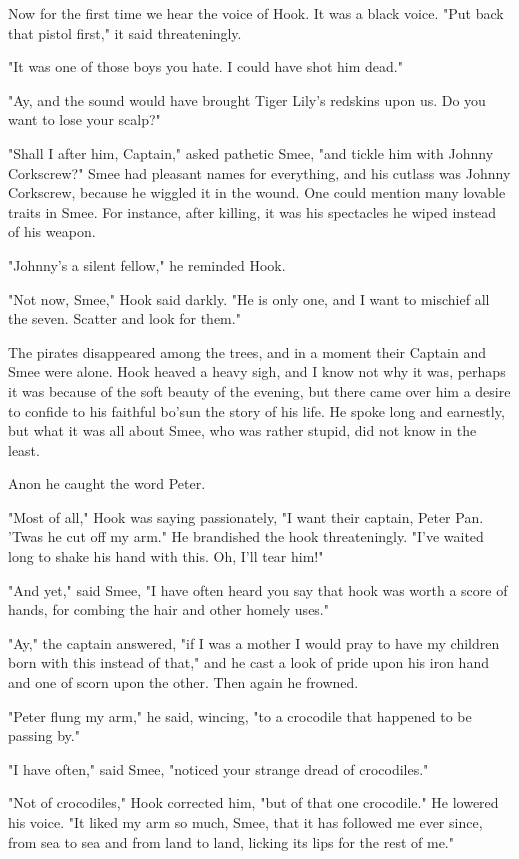 Now for the first time we hear the voice of Hook.
It was a black voice.
"Put back that pistol first," it said threateningly.

"It was one of those boys you hate.
I could have shot him dead."

"Ay, and the sound would have brought Tiger Lily's redskins upon us.
Do you want to lose your scalp?"

"Shall I after him, Captain," asked pathetic Smee, "and tickle him with Johnny Corkscrew?"
Smee had pleasant names for everything,
and his cutlass was Johnny Corkscrew, because he wiggled it in the wound.
One could mention many lovable traits in Smee.
For instance, after killing, it was his spectacles he wiped instead of his weapon.

"Johnny's a silent fellow," he reminded Hook.

"Not now, Smee," Hook said darkly.
"He is only one, and I want to mischief all the seven.
Scatter and look for them."

The pirates disappeared among the trees,
and in a moment their Captain and Smee were alone.
Hook heaved a heavy sigh, and I know not why it was,
perhaps it was because of the soft beauty of the evening,
but there came over him a desire to confide to his faithful bo'sun the story of his life.
He spoke long and earnestly, but what it was all about Smee, who was rather stupid, did not know in the least.

Anon he caught the word Peter.

"Most of all," Hook was saying passionately, "I want their captain, Peter Pan.
'Twas he cut off my arm."
He brandished the hook threateningly.
"I've waited long to shake his hand with this.
Oh, I'll tear him!"

"And yet," said Smee,
"I have often heard you say that hook was worth a score of hands,
for combing the hair and other homely uses."

"Ay," the captain answered,
"if I was a mother I would pray to have my children born with this instead of that,"
and he cast a look of pride upon his iron hand and one of scorn upon the other.
Then again he frowned.

"Peter flung my arm," he said, wincing, "to a crocodile that happened to be passing by."

"I have often," said Smee, "noticed your strange dread of crocodiles."

"Not of crocodiles," Hook corrected him, "but of that one crocodile."
He lowered his voice.
"It liked my arm so much, Smee, that it has followed me ever since,
from sea to sea and from land to land, licking its lips for the rest of me."

